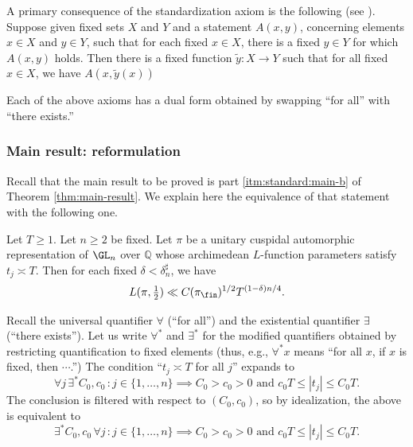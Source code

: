 A primary consequence of the standardization axiom is the following (see \cite[Thm 1.3]{MR469763}).  Suppose given fixed sets $X$ and $Y$ and a statement $A(x,y)$, concerning elements $x \in X$ and $y \in Y$, such that for each fixed $x \in X$, there is a fixed $y \in Y$ for which $A(x,y)$ holds.  Then there is a fixed function $\tilde{y} : X \rightarrow Y$ such that for all fixed $x \in X$, we have $A(x, \tilde{y}(x))$

Each of the above axioms has a dual form obtained by swapping ``for all'' with ``there exists.''

\subsubsection{Main result: reformulation}\label{sec:main-result:-reform}
Recall that the main result to be proved is part \eqref{itm:standard:main-b} of Theorem \ref{thm:main-result}.  We explain here the equivalence of that statement with the following one.
\begin{theorem}\label{thm:main-result-reformulated}
  Let $T \geq 1$.  Let $n \geq 2$ be fixed.  Let $\pi$ be a unitary cuspidal automorphic representation of $\GL_n$ over $\mathbb{Q}$ whose archimedean $L$-function parameters satisfy $t_j \asymp T$.  Then for each fixed $\delta < \delta_n^\sharp$, we have
  \begin{equation*}
    L(\pi, \tfrac{1}{2}) \ll C(\pi_{\fin})^{1/2} T^{(1-\delta)n/4}.
  \end{equation*}
\end{theorem}
Recall the universal quantifier $\forall$ (``for all'') and the existential quantifier $\exists$ (``there exists'').  Let us write $\forall^*$ and $\exists^*$ for the modified quantifiers obtained by restricting quantification to fixed elements (thus, e.g., $\forall^* x$ means ``for all $x$, if $x$ is fixed, then $\dotsb$.'')  The condition ``$t_j \asymp T$ for all $j$'' expands to
\begin{equation*}
  \forall j \, \exists^* C_0, c_0 \, : j \in \{1, \dotsc, n\} \implies C_0 > c_0 > 0 \text{ and }  c_0 T \leq |t_j| \leq C_0 T.
\end{equation*}
The conclusion is filtered with respect to $(C_0,c_0)$, so by idealization, the above is equivalent to
\begin{equation*}
  \exists^* C_0, c_0 \,   \forall j \, : j \in \{1, \dotsc, n\} \implies C_0 > c_0 > 0 \text{ and }  c_0 T \leq |t_j| \leq C_0 T.
\end{equation*}

